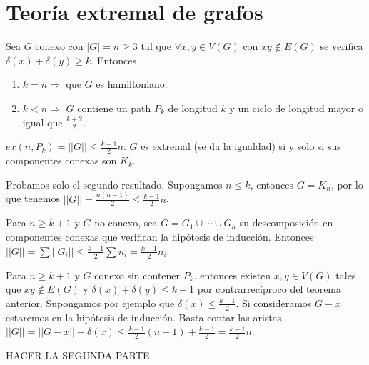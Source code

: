 \documentclass[TGyGC.tex]{subfiles}
\begin{document}
\chapter{Teoría extremal de grafos}

\begin{teorema}
Sea $G$ conexo con $|G|=n\geq 3$ tal que $\forall x, y\in V(G)$ con $xy\notin E(G)$ se verifica $\delta(x)+\delta(y)\geq k$. Entonces 

\begin{enumerate}
\item $k=n\Rightarrow$ que $G$ es hamiltoniano.
\item $k<n\Rightarrow$ $G$ contiene un path $P_k$ de longitud $k$ y un ciclo de longitud mayor o igual que $\frac{k+2}{2}$. 
\end{enumerate}
\end{teorema}

\begin{teorema}
$ex(n,P_k)=||G||\leq\frac{k-1}{2}n$. $G$ es extremal (se da la igualdad) si y solo si sus componentes conexas son $K_k$. 
\end{teorema}

\begin{dem}
Probamos solo el segundo resultado. Supongamos $n\leq k$, entonces $G=K_n$, por lo que tenemos $||G||=\frac{n(n-1)}{2}\leq\frac{k-1}{2}n$.

Para $n\geq k+1$ y $G$ no conexo, sea $G=G_1\cup\cdots \cup G_h$ su descomposición en componentes conexas que verifican la hipótesis de inducción. Entonces $||G||=\sum||G_i||\leq\frac{k-1}{2}\sum n_i=\frac{k-1}{2}n_i$.

Para $n\geq k+1$ y $G$ conexo sin contener $P_k$, entonces existen $x,y\in V(G)$ tales que $xy\notin E(G)$ y $\delta(x)+\delta(y)\leq k-1$ por contrarrecíproco del teorema anterior. Supongamos por ejemplo que $\delta(x)\leq\frac{k-1}{2}$. Si consideramos $G-x$ estaremos en la hipótesis de inducción. Basta contar las aristas. $||G||=||G-x||+\delta(x)\leq\frac{k-1}{2}(n-1)+\frac{k-1}{2}=\frac{k-1}{2}n$.

HACER LA SEGUNDA PARTE



\end{dem}
\end{document}
